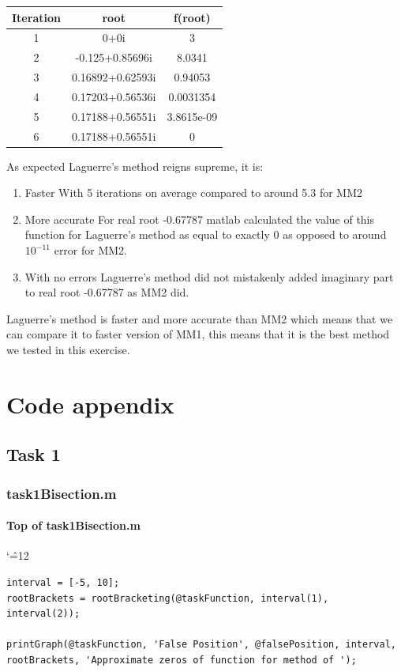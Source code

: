 \documentclass[12pt]{report}
\newenvironment{simplechar}{%
   \catcode`\^=12
}{}
\begin{document}
\begin{center}
  \begin{tabular}{| c  c c |}
\hline
Iteration & root         & f(root) \\
\hline
1   &         0+0i          &            3 \\
\hline
2   &    -0.125+0.85696i    &       8.0341 \\
\hline
3   &   0.16892+0.62593i    &      0.94053 \\
\hline
4   &   0.17203+0.56536i    &    0.0031354  \\
\hline
5   &   0.17188+0.56551i    &   3.8615e-09  \\
\hline
6   &   0.17188+0.56551i    &            0  \\
\hline
\hline

\end{tabular}
\end{center}

As expected Laguerre's method reigns supreme, it is:
\begin{enumerate}
\item Faster
With 5 iterations on average compared to around 5.3 for MM2
\item More accurate
For real root -0.67787 matlab calculated the value of this function for Laguerre's method as equal to exactly 0 as opposed to around $10^{-11}$ error for MM2.
\item With no errors
Laguerre's method did not mistakenly added imaginary part to real root -0.67787 as MM2 did. 
\end{enumerate}

Laguerre's method is faster and more accurate than MM2 which means that we can compare it to faster version of MM1, this means that it is the best method we tested in this exercise.

\chapter{Code appendix}

\section{Task 1}

\subsection{task1Bisection.m}

\subsubsection{Top of task1Bisection.m}
\begin{simplechar}
\begin{lstlisting}
interval = [-5, 10];
rootBrackets = rootBracketing(@taskFunction, interval(1), interval(2));

printGraph(@taskFunction, 'False Position', @falsePosition, interval, rootBrackets, 'Approximate zeros of function for method of ');
\end{lstlisting}
\end{simplechar}
\end{document}
